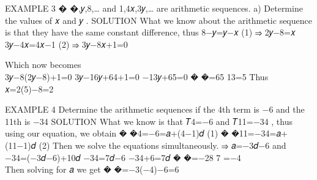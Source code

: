 \documentclass[
  letterpaper,
  DIV=11,
  numbers=noendperiod]{scrreprt}
\begin{document}
EXAMPLE 3 � �,𝑦,8,\ldots{} and 1,4𝑥,3𝑦,\ldots{} are arithmetic
sequences. a) Determine the values of 𝑥 and 𝑦 . SOLUTION What we know
about the arithmetic sequence is that they have the same constant
difference, thus 8−𝑦=𝑦−𝑥 (1) ⇒ 2𝑦−8=𝑥 3𝑦−4𝑥=4𝑥−1 (2) ⇒ 3𝑦−8𝑥+1=0

Which now becomes\\
3𝑦−8(2𝑦−8)+1=0 3𝑦−16𝑦+64+1=0 −13𝑦+65=0 � �=65 13=5 Thus 𝑥=2(5)−8=2

EXAMPLE 4 Determine the arithmetic sequences if the 4th term is −6 and
the 11th is −34 SOLUTION What we know is that 𝑇4=−6 and 𝑇11=−34 , thus
using our equation, we obtain � �4=−6=𝑎+(4−1)𝑑 (1) � �11=−34=𝑎+(11−1)𝑑
(2) Then we solve the equations simultaneously. ⇒ 𝑎=−3𝑑−6 and\\
−34=(−3𝑑−6)+10𝑑 −34=7𝑑−6 −34+6=7𝑑 � �=−28 7 =−4\\
Then solving for 𝑎 we get � �=−3(−4)−6=6
\end{document}
